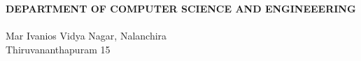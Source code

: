 \begin{titlepage}
\begin{center}
 \begin{figure}[ht]
 \begin{center}
 \end{center}
 \end{figure}

{\sf \textbf{\textcolor[rgb]{0,0,0}{DEPARTMENT OF COMPUTER SCIENCE AND ENGINEEERING}}}\\[0.5ex]
{\sf {\textcolor[rgb]{0,0,0}{MAR BASELIOS COLLEGE OF ENGINEERING \& TECHNOLOGY}}}\\[0.4ex]
Mar Ivanios Vidya Nagar, Nalanchira\\
{\sf \textcolor[rgb]{0,0,0}{Thiruvananthapuram 15}}\\[0.5ex]

\end{center}
\end{titlepage}
